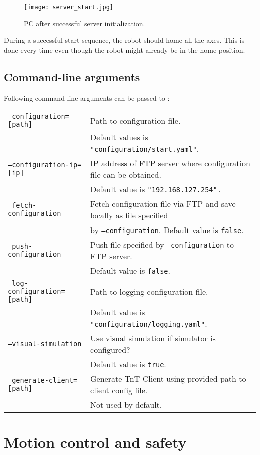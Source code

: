 \begin{figure}[h]
	\centering
	\texttt{[image: server\_start.jpg]}
	\caption{PC after successful server initialization.}
	\label{fig:server_start}
\end{figure}

During a successful start sequence, the robot should home all the axes. This is done every time even though the robot might already be in the home position.

\subsection{Command-line arguments}

Following command-line arguments can be passed to \tntServerExecutable :

\begin{tabular}{ll}
 \texttt{--configuration=[path]} & Path to configuration file. \\
 & Default values is \texttt{"configuration/start.yaml"}. \\ 
\texttt{--configuration-ip=[ip]} & IP address of FTP server where configuration file can be obtained. \\ 
 & Default value is \texttt{"192.168.127.254".}\\
 \texttt{--fetch-configuration} & Fetch configuration file via FTP and save locally as file specified \\
  & by \texttt{--configuration}. Default value is \texttt{false}.\\
 \texttt{--push-configuration} & Push file specified by \texttt{--configuration} to FTP server. \\
  & Default value is \texttt{false}.\\
  \texttt{--log-configuration=[path]} & Path to logging configuration file. \\
  & Default value is \texttt{"configuration/logging.yaml"}.\\
  \texttt{--visual-simulation} & Use visual simulation if simulator is configured?\\
  & Default value is \texttt{true}.\\
  \texttt{--generate-client=[path]} & Generate TnT Client using provided path to client config file.\\
  & Not used by default.
\end{tabular} 

\section{Motion control and safety}

